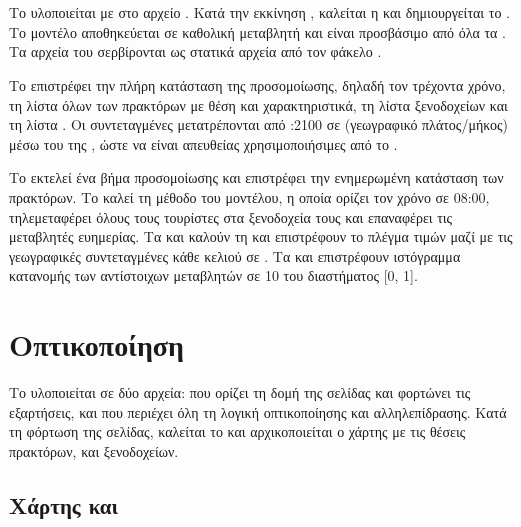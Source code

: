 \section{}

Το  υλοποιείται με  στο αρχείο .
Κατά την εκκίνηση , καλείται η
 και δημιουργείται το . Το
μοντέλο αποθηκεύεται σε καθολική μεταβλητή και είναι προσβάσιμο από
όλα τα . Τα αρχεία του  σερβίρονται ως
στατικά αρχεία από τον φάκελο .

Το  επιστρέφει την πλήρη κατάσταση της
προσομοίωσης, δηλαδή τον τρέχοντα χρόνο, τη λίστα όλων των πρακτόρων
με θέση και χαρακτηριστικά, τη λίστα ξενοδοχείων και τη λίστα .
Οι συντεταγμένες μετατρέπονται από :2100 σε 
(γεωγραφικό πλάτος/μήκος) μέσω του  της ,
ώστε να είναι απευθείας χρησιμοποιήσιμες από το .

Το  εκτελεί ένα βήμα προσομοίωσης
 και επιστρέφει την ενημερωμένη κατάσταση των
πρακτόρων. Το  καλεί τη μέθοδο
 του μοντέλου, η οποία ορίζει τον χρόνο σε
08:00, τηλεμεταφέρει όλους τους τουρίστες στα ξενοδοχεία τους και
επαναφέρει τις μεταβλητές ευημερίας. Τα  και  καλούν τη
 και επιστρέφουν το πλέγμα τιμών μαζί με
τις γεωγραφικές συντεταγμένες κάθε κελιού σε . Τα
 και
 επιστρέφουν ιστόγραμμα κατανομής
των αντίστοιχων μεταβλητών σε 10  του διαστήματος [0, 1].

\section{ Οπτικοποίηση}

Το  υλοποιείται σε δύο αρχεία:  που
ορίζει τη δομή της σελίδας και φορτώνει τις εξαρτήσεις, και
 που περιέχει όλη τη λογική οπτικοποίησης και
αλληλεπίδρασης. Κατά τη φόρτωση της σελίδας, καλείται το
 και αρχικοποιείται ο χάρτης με τις θέσεις
πρακτόρων,  και ξενοδοχείων.

\subsection{Χάρτης  και }

